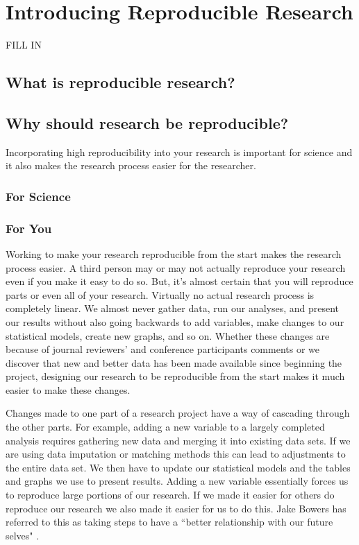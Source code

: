 \documentclass[ChapterTOCs,krantz1]{krantz}\usepackage{graphicx, color}
\begin{document}
\chapter{Introducing Reproducible Research}

FILL IN

\section{What is reproducible research?}

\section{Why should research be reproducible?}

Incorporating high reproducibility into your research is important for science and it also makes the research process easier for the researcher. 

\subsection{For Science}

\subsection{For You}

Working to make your research reproducible from the start makes the research process easier. A third person may or may not actually reproduce your research even if you make it easy to do so. But, it's almost certain that you will reproduce parts or even all of your research. Virtually no actual research process is completely linear. We almost never gather data, run our analyses, and present our results without also going backwards to add variables, make changes to our statistical models, create new graphs, and so on. Whether these changes are because of journal reviewers' and conference participants comments or we discover that new and better data has been made available since beginning the project, designing our research to be reproducible from the start makes it much easier to make these changes. 

Changes made to one part of a research project have a way of cascading through the other parts. For example, adding a new variable to a largely completed analysis requires gathering new data and merging it into existing data sets. If we are using data imputation or matching methods this can lead to adjustments to the entire data set. We then have to update our statistical models and the tables and graphs we use to present results. Adding a new variable essentially forces us to reproduce large portions of our research. If we made it easier for others do reproduce our research we also made it easier for us to do this. Jake Bowers has referred to this as taking steps to have a ``better relationship with our future selves" .
\end{document}
